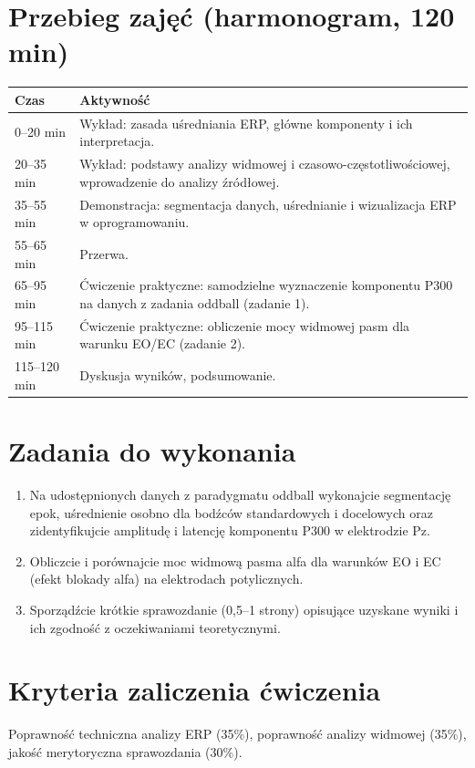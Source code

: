 \documentclass[11pt,a4paper]{article}
\begin{document}
\section{Przebieg zajęć (harmonogram, 120 min)}
\begin{center}
\begin{tabular}{@{}p{2.3cm}p{11.7cm}@{}}
\toprule
\textbf{Czas} & \textbf{Aktywność}\\
\midrule
0--20 min & Wykład: zasada uśredniania ERP, główne komponenty i ich interpretacja.\\
20--35 min & Wykład: podstawy analizy widmowej i czasowo-częstotliwościowej, wprowadzenie do analizy źródłowej.\\
35--55 min & Demonstracja: segmentacja danych, uśrednianie i wizualizacja ERP w oprogramowaniu.\\
55--65 min & Przerwa.\\
65--95 min & Ćwiczenie praktyczne: samodzielne wyznaczenie komponentu P300 na danych z zadania oddball (zadanie 1).\\
95--115 min & Ćwiczenie praktyczne: obliczenie mocy widmowej pasm dla warunku EO/EC (zadanie 2).\\
115--120 min & Dyskusja wyników, podsumowanie.\\
\bottomrule
\end{tabular}
\end{center}

\section{Zadania do wykonania}
\begin{enumerate}[label=\textbf{Zadanie \arabic*.}, leftmargin=2.7cm]
  \item Na udostępnionych danych z paradygmatu oddball wykonajcie segmentację epok, uśrednienie osobno dla bodźców standardowych i docelowych oraz zidentyfikujcie amplitudę i latencję komponentu P300 w elektrodzie Pz.
  \item Obliczcie i porównajcie moc widmową pasma alfa dla warunków EO i EC (efekt blokady alfa) na elektrodach potylicznych.
  \item Sporządźcie krótkie sprawozdanie (0,5--1 strony) opisujące uzyskane wyniki i ich zgodność z oczekiwaniami teoretycznymi.
\end{enumerate}

\section{Kryteria zaliczenia ćwiczenia}
Poprawność techniczna analizy ERP (35\%), poprawność analizy widmowej (35\%), jakość merytoryczna sprawozdania (30\%).
\end{document}

